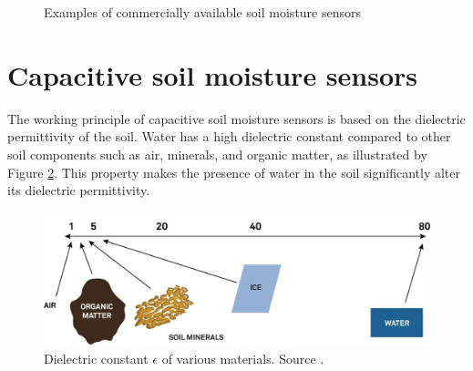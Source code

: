 \begin{figure}
    \hfil
    \caption{\label{fig:satellite}Examples of commercially available soil moisture sensors \cite{meter_group_teros_nodate, baseline_soil_2021, czechproject_spol_sro_pudni_2024}}
\end{figure}

\section{Capacitive soil moisture sensors}
The working principle of capacitive soil moisture sensors is based on the dielectric permittivity of the soil. Water has a high dielectric constant compared to other soil components such as air, minerals, and organic matter, as illustrated by Figure \ref{fig:dielectric-constant}. This property makes the presence of water in the soil significantly alter its dielectric permittivity.

\begin{figure}
    \includegraphics[width=.7\textwidth]{img/dielectric-constant.jpg}
    \caption{\label{fig:dielectric-constant}Dielectric constant $\epsilon$ of various materials. Source \cite{meter_group_soil_2023}.}
\end{figure}

